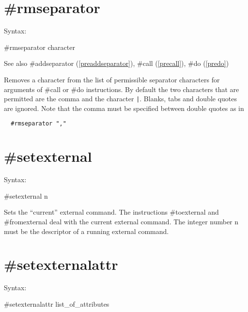  
\section{\#rmseparator}
\label{prermseparator}

\noindent Syntax:

\#rmseparator character
 
\noindent See also \#addseparator (\ref{preaddseparator}),
            \#call (\ref{precall}), \#do (\ref{predo})

\noindent Removes a character from the list of permissible 
separator characters for arguments of \#call or \#do instructions. By 
default the two characters that are permitted are the comma and the 
character \verb:|:. Blanks, tabs and double quotes are ignored. Note that 
the comma must be specified between double quotes as in
\begin{verbatim}
  #rmseparator ","
\end{verbatim}


\section{\#setexternal}
\label{presetexternal}

\noindent Syntax:

\#setexternal n

\noindent Sets the ``current'' external command. The 
instructions \#toexternal and 
\#fromexternal deal with the current external 
command.  The integer number n must be the descriptor of a running external 
command.


\section{\#setexternalattr}
\label{presetexternalattr}

\noindent Syntax:

\#setexternalattr list\_of\_attributes

